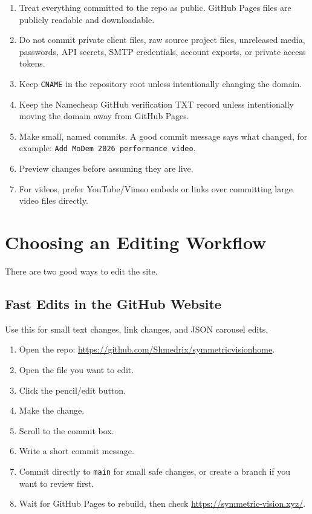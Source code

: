\documentclass[11pt]{article}
\begin{document}
\begin{enumerate}
  \item Treat everything committed to the repo as public. GitHub Pages files are publicly readable and downloadable.
  \item Do not commit private client files, raw source project files, unreleased media, passwords, API secrets, SMTP credentials, account exports, or private access tokens.
  \item Keep \texttt{CNAME} in the repository root unless intentionally changing the domain.
  \item Keep the Namecheap GitHub verification TXT record unless intentionally moving the domain away from GitHub Pages.
  \item Make small, named commits. A good commit message says what changed, for example: \texttt{Add MoDem 2026 performance video}.
  \item Preview changes before assuming they are live.
  \item For videos, prefer YouTube/Vimeo embeds or links over committing large video files directly.
\end{enumerate}

\section{Choosing an Editing Workflow}

There are two good ways to edit the site.

\subsection{Fast Edits in the GitHub Website}

Use this for small text changes, link changes, and JSON carousel edits.

\begin{enumerate}
  \item Open the repo: \url{https://github.com/Shmedrix/symmetricvisionhome}.
  \item Open the file you want to edit.
  \item Click the pencil/edit button.
  \item Make the change.
  \item Scroll to the commit box.
  \item Write a short commit message.
  \item Commit directly to \texttt{main} for small safe changes, or create a branch if you want to review first.
  \item Wait for GitHub Pages to rebuild, then check \url{https://symmetric-vision.xyz/}.
\end{enumerate}
\end{document}
